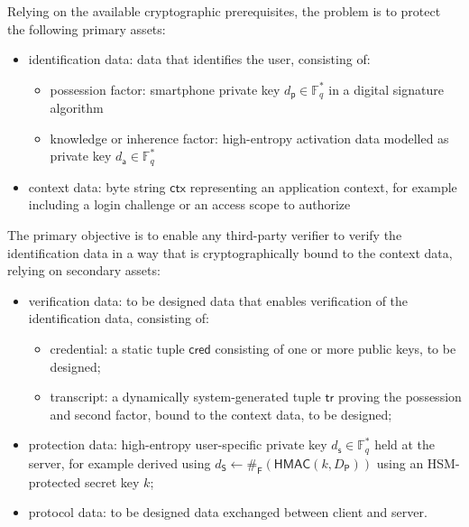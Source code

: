 \documentclass[a4paper]{article}
\begin{document}
Relying on the available cryptographic prerequisites, the problem is to protect the following primary assets:
\begin{itemize}
\item identification data: data that identifies the user, consisting of:
	\begin{itemize}
	\item possession factor: smartphone private key $d_\mathsf p\in\mathbb{F}^*_q$ in a digital signature algorithm
	\item knowledge or inherence factor: high-entropy activation data modelled as private key $d_\mathsf a\in\mathbb{F}^*_q$
	\end{itemize}
\item context data: byte string $\mathsf{ctx}$ representing an application context, for example including a login challenge or an access scope to authorize
\end{itemize}

The primary objective is to enable any third-party verifier to verify the identification data in a way that is cryptographically bound to the context data, relying on secondary assets:
\begin{itemize}
\item verification data: to be designed data that enables verification of the identification data, consisting of:
	\begin{itemize}
	\item credential: a static tuple $\mathsf{cred}$ consisting of one or more public keys, to be designed;
	\item transcript: a dynamically system-generated tuple $\mathsf{tr}$ proving the possession and second factor, bound to the context data, to be designed;
	\end{itemize}
\item protection data: high-entropy user-specific private key $d_\textsf{s}\in\mathbb{F}^*_q$ held at the server, for example derived using $d_\mathsf S\leftarrow\#_\mathsf F(\mathsf{HMAC}(k,D_\mathsf{P}))$ using an HSM-protected secret key $k$;
\item protocol data: to be designed data exchanged between client and server.
\end{itemize}
\end{document}
